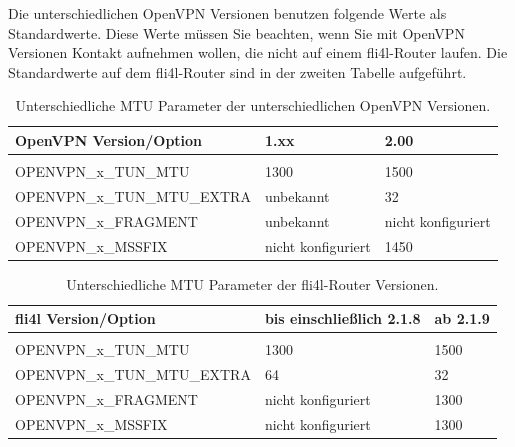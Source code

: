 Die unterschiedlichen OpenVPN Versionen benutzen folgende Werte als
Standardwerte. Diese Werte müssen Sie beachten, wenn Sie mit OpenVPN
Versionen Kontakt aufnehmen wollen, die nicht auf einem fli4l-Router
laufen. Die Standardwerte auf dem fli4l-Router sind in der zweiten
Tabelle aufgeführt.

\begin{table}[htbp]
  \begin{scriptsize}
    \begin{tabular}{lll}
      OpenVPN Version/Option        & 1.xx                & 2.00        \\
      \hline                                                    \\
      OPENVPN\_x\_TUN\_MTU          & 1300                & 1500        \\
      OPENVPN\_x\_TUN\_MTU\_EXTRA   & unbekannt           & 32          \\
      OPENVPN\_x\_FRAGMENT          & unbekannt           & nicht konfiguriert  \\
      OPENVPN\_x\_MSSFIX            & nicht konfiguriert  & 1450        \\
    \end{tabular}
  \end{scriptsize}
  \caption{Unterschiedliche MTU Parameter der unterschiedlichen OpenVPN Versionen.}
\end{table}

\begin{table}[htbp]
  \begin{scriptsize}
    \begin{tabular}{lll}
      fli4l Version/Option          & bis einschließlich 2.1.8  & ab 2.1.9  \\
      \hline                                                    \\
      OPENVPN\_x\_TUN\_MTU          & 1300                & 1500        \\
      OPENVPN\_x\_TUN\_MTU\_EXTRA   & 64                  & 32          \\
      OPENVPN\_x\_FRAGMENT          & nicht konfiguriert  & 1300        \\
      OPENVPN\_x\_MSSFIX            & nicht konfiguriert  & 1300        \\
    \end{tabular}
  \end{scriptsize}
  \caption{Unterschiedliche MTU Parameter der fli4l-Router Versionen.}
\end{table}

